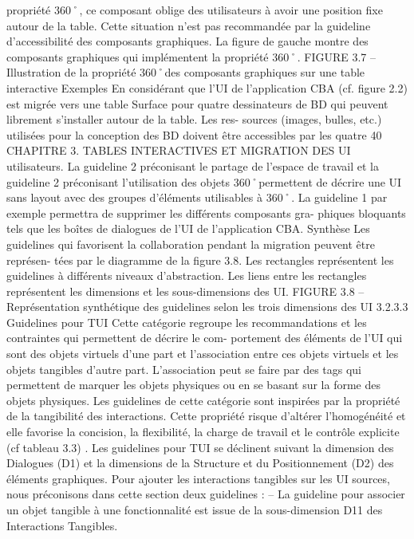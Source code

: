 \documentclass{article}
\begin{document}
propriété 360˚, ce composant oblige des utilisateurs à avoir une position ﬁxe autour de la table. Cette
situation n’est pas recommandée par la guideline d’accessibilité des composants graphiques.
La ﬁgure de gauche montre des composants graphiques qui implémentent la propriété 360˚.
FIGURE 3.7 – Illustration de la propriété 360˚des composants graphiques sur une table interactive
Exemples
En considérant que l’UI de l’application CBA (cf. ﬁgure 2.2) est migrée vers une table
Surface pour quatre dessinateurs de BD qui peuvent librement s’installer autour de la table. Les res-
sources (images, bulles, etc.) utilisées pour la conception des BD doivent être accessibles par les quatre
40
CHAPITRE 3. TABLES INTERACTIVES ET MIGRATION DES UI
utilisateurs. La guideline 2 préconisant le partage de l’espace de travail et la guideline 2 préconisant
l’utilisation des objets 360˚permettent de décrire une UI sans layout avec des groupes d’éléments
utilisables à 360˚. La guideline 1 par exemple permettra de supprimer les différents composants gra-
phiques bloquants tels que les boîtes de dialogues de l’UI de l’application CBA.
Synthèse
Les guidelines qui favorisent la collaboration pendant la migration peuvent être représen-
tées par le diagramme de la ﬁgure 3.8. Les rectangles représentent les guidelines à différents niveaux
d’abstraction. Les liens entre les rectangles représentent les dimensions et les sous-dimensions des
UI.
FIGURE 3.8 – Représentation synthétique des guidelines selon les trois dimensions des UI
3.2.3.3
Guidelines pour TUI
Cette catégorie regroupe les recommandations et les contraintes qui permettent de décrire le com-
portement des éléments de l’UI qui sont des objets virtuels d’une part et l’association entre ces objets
virtuels et les objets tangibles d’autre part. L’association peut se faire par des tags qui permettent de
marquer les objets physiques ou en se basant sur la forme des objets physiques. Les guidelines de
cette catégorie sont inspirées par la propriété de la tangibilité des interactions. Cette propriété risque
d’altérer l’homogénéité et elle favorise la concision, la ﬂexibilité, la charge de travail et le contrôle
explicite (cf tableau 3.3) .
Les guidelines pour TUI se déclinent suivant la dimension des Dialogues (D1) et la dimensions de
la Structure et du Positionnement (D2) des éléments graphiques. Pour ajouter les interactions tangibles
sur les UI sources, nous préconisons dans cette section deux guidelines :
– La guideline pour associer un objet tangible à une fonctionnalité est issue de la sous-dimension
D11 des Interactions Tangibles.
\end{document}
